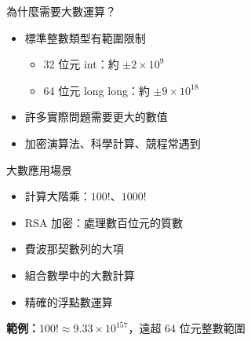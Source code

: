 \documentclass{beamer}
\begin{document}
\begin{frame}{為什麼需要大數運算？}
\begin{itemize}
    \item 標準整數類型有範圍限制
    \begin{itemize}
        \item 32 位元 int：約 $\pm 2 \times 10^9$
        \item 64 位元 long long：約 $\pm 9 \times 10^{18}$
    \end{itemize}
    \item 許多實際問題需要更大的數值
    \item 加密演算法、科學計算、競程常遇到
\end{itemize}

\vspace{1em}
\begin{block}{大數應用場景}
\begin{itemize}
    \item 計算大階乘：$100!$、$1000!$
    \item RSA 加密：處理數百位元的質數
    \item 費波那契數列的大項
    \item 組合數學中的大數計算
    \item 精確的浮點數運算
\end{itemize}
\end{block}

\vspace{1em}
\textbf{範例：}$100! \approx 9.33 \times 10^{157}$，遠超 64 位元整數範圍
\end{frame}
\end{document}
